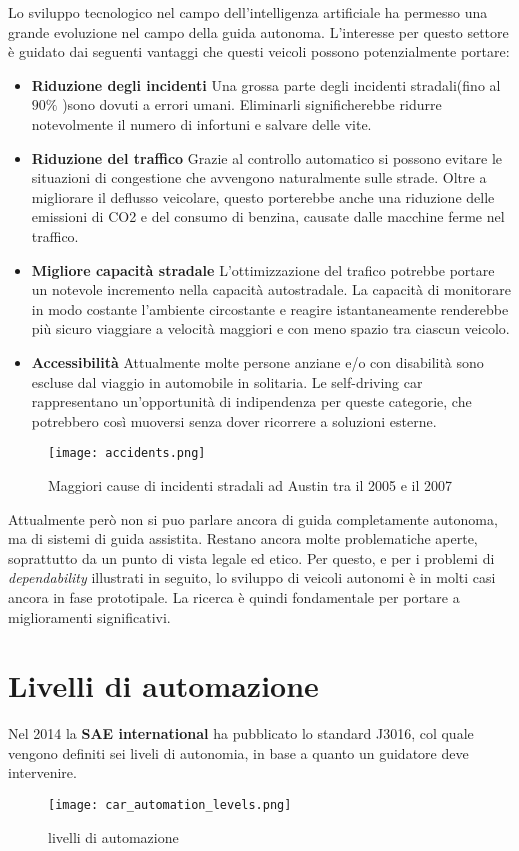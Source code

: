 Lo sviluppo tecnologico nel campo dell'intelligenza artificiale ha permesso una grande evoluzione nel campo della guida autonoma. L'interesse per questo 
settore è guidato dai seguenti vantaggi che questi veicoli possono potenzialmente portare\cite{advantages}:
\begin{itemize}
    \item \textbf{Riduzione degli incidenti} Una grossa parte degli incidenti stradali(fino al $90\%$ )sono dovuti a errori umani. Eliminarli
    significherebbe ridurre notevolmente il numero di infortuni e salvare delle vite.
    \item \textbf{Riduzione del traffico} Grazie al controllo automatico si possono evitare le situazioni di congestione che avvengono naturalmente sulle strade.
    Oltre a migliorare il deflusso veicolare, questo porterebbe anche  una riduzione delle emissioni di CO2 e del consumo di benzina, causate dalle macchine ferme nel traffico.
    \item \textbf{Migliore capacità stradale} L'ottimizzazione del trafico potrebbe portare un notevole incremento nella capacità autostradale. La capacità
    di monitorare in modo costante l'ambiente circostante e reagire istantaneamente renderebbe più sicuro viaggiare a velocità maggiori e con meno spazio tra ciascun veicolo.
    \item \textbf{Accessibilità} Attualmente  molte persone anziane  e/o con disabilità sono escluse dal viaggio in automobile in solitaria. Le self-driving car rappresentano un'opportunità
    di indipendenza per queste categorie, che potrebbero così muoversi senza dover ricorrere a soluzioni esterne.
\end{itemize}
\begin{figure}
    \texttt{[image: accidents.png]}
    \caption{Maggiori cause di incidenti stradali ad Austin tra il 2005 e il 2007\cite{accid}}
    \label{fig:accid}
\end{figure}
Attualmente però non si puo parlare ancora di guida completamente autonoma, ma di sistemi di guida assistita. Restano ancora molte problematiche aperte, soprattutto 
da un punto di vista legale\cite{legal} ed etico\cite{Lin2015}. Per questo, e per i problemi di \emph{dependability} illustrati in seguito, lo sviluppo
di veicoli autonomi è in molti casi ancora in fase prototipale. La ricerca è quindi fondamentale per portare a miglioramenti significativi.
\section{Livelli di automazione}
Nel 2014 la \textbf{SAE international} ha pubblicato lo standard J3016, col quale vengono definiti sei liveli di autonomia, in base a quanto un guidatore deve intervenire.
\begin{figure}
    \texttt{[image: car\_automation\_levels.png]}
    \caption{livelli di automazione\cite{car}}
    \label{fig:adaslevel}
\end{figure}
